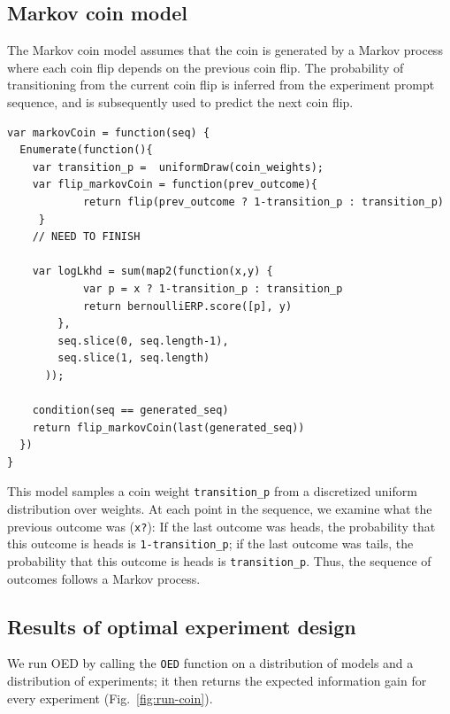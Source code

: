 \documentclass{article}
\begin{document}
\subsection{Markov coin model}
\label{s:tutorial:sss:markov}
The Markov coin model assumes that the coin is generated by a Markov process where each coin flip depends on the previous coin flip. The probability of transitioning from the current coin flip is inferred from the experiment prompt sequence, and is subsequently used to predict the next coin flip.
%

%

\begin{lstlisting}[caption=Markov coin model]
var markovCoin = function(seq) {
  Enumerate(function(){
    var transition_p =  uniformDraw(coin_weights);
    var flip_markovCoin = function(prev_outcome){
    		return flip(prev_outcome ? 1-transition_p : transition_p)
	 }
	// NEED TO FINISH

    var logLkhd = sum(map2(function(x,y) {
    		var p = x ? 1-transition_p : transition_p
     	 	return bernoulliERP.score([p], y)
    	},
    	seq.slice(0, seq.length-1),
    	seq.slice(1, seq.length)
	  ));

    condition(seq == generated_seq)
    return flip_markovCoin(last(generated_seq))
  })
}
\end{lstlisting}
%
This model samples a coin weight \lstinline{transition_p} from a discretized uniform distribution over weights.
At each point in the sequence, we examine what the previous outcome was (\lstinline{x?}): If the last outcome was heads, the probability that this outcome is heads is \lstinline{1-transition_p}; if the last outcome was tails, the probability that this outcome is heads is \lstinline{transition_p}. Thus, the sequence of outcomes follows a Markov process.

\subsection{Results of optimal experiment design}

We run OED by calling the \lstinline{OED} function on a distribution of models and a distribution of experiments; it then returns the expected information gain for every experiment (Fig.~\ref{fig:run-coin}).
\end{document}
